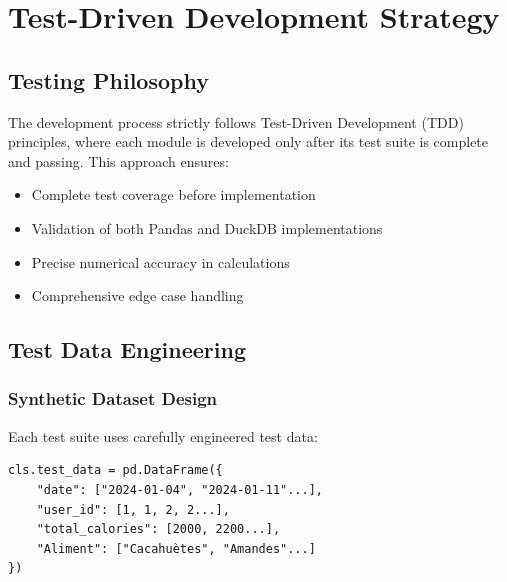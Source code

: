 \section{Test-Driven Development Strategy}

\subsection{Testing Philosophy}
The development process strictly follows Test-Driven Development (TDD) principles, where each module is developed only after its test suite is complete and passing. This approach ensures:

\begin{itemize}
    \item Complete test coverage before implementation
    \item Validation of both Pandas and DuckDB implementations
    \item Precise numerical accuracy in calculations
    \item Comprehensive edge case handling
\end{itemize}

\subsection{Test Data Engineering}

\subsubsection{Synthetic Dataset Design}
Each test suite uses carefully engineered test data:

\begin{lstlisting}[style=pythonstyle, caption=Test Data Example]
cls.test_data = pd.DataFrame({
    "date": ["2024-01-04", "2024-01-11"...],
    "user_id": [1, 1, 2, 2...],
    "total_calories": [2000, 2200...],
    "Aliment": ["Cacahuètes", "Amandes"...]
})
\end{lstlisting}

